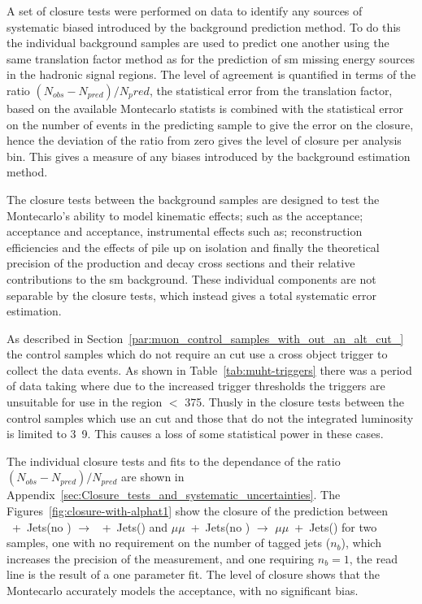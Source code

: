 A set of closure tests were performed on data to identify any sources of 
systematic biased introduced by the background prediction method.
To do this the individual background samples are used to predict one another 
using the same translation factor method as for the prediction of \ac{sm} 
missing energy sources in the hadronic signal regions. The level of agreement 
is quantified in terms of the ratio $\left(N_{obs} - N_{pred}\right)/N_pred$, 
the statistical error from the translation factor, based on the available 
Montecarlo statists is combined with the statistical error on the number of 
events in the predicting sample to give the error on the closure, hence the 
deviation of the ratio from zero gives the level of closure per analysis bin. 
This gives a measure of any biases introduced by the background estimation 
method.

The closure tests between the background samples are designed to test the 
Montecarlo's ability to model kinematic effects; such as the \alt acceptance; 
\Pmu acceptance and \Pphoton acceptance, instrumental effects such as; 
reconstruction efficiencies and the effects of pile up on isolation and finally 
the theoretical precision of the production and decay cross sections and their 
relative contributions to the \ac{sm} background. These individual components 
are not separable by the closure tests, which instead gives a total systematic 
error estimation.

As described in Section~\ref{par:muon_control_samples_with_out_an_alt_cut_} the 
control samples which do not require an \alt cut use a \muht cross object 
trigger to collect the data events. As shown in Table~\ref{tab:muht-triggers} 
there was a period of data taking where due to the increased trigger thresholds 
the \muht triggers are unsuitable for use in the region \HT $<$ 
\unit{375}{\GeV}. Thusly in the closure tests between the control samples which 
use an \alt cut and those that do not the integrated luminosity is limited to 
\unit{3.9}{\invfb}. This causes a loss of some statistical power in these cases.

The individual closure tests and fits to the \HT dependance of the ratio 
$\left(N_{obs} - N_{pred}\right)/N_{pred}$ are shown in 
Appendix~\ref{sec:Closure_tests_and_systematic_uncertainties}.
The Figures~\ref{fig:closure-with-alphat1} show the closure of the prediction 
between \Pmu~+~Jets(no \alt) $\rightarrow$ \Pmu~+~Jets(\altg) and $\mu\mu$~+~Jets(no \alt) $\rightarrow$ 
$\mu\mu$~+~Jets(\altg) for two samples, one with no requirement on the number of \Pbottom 
tagged jets ($n_{b}$), which increases the precision of the measurement, and 
one requiring $n_{b} = 1$, the read line is the result of a one parameter fit. 
The level of closure shows that the Montecarlo accurately models the \alt 
acceptance, with no significant bias.

